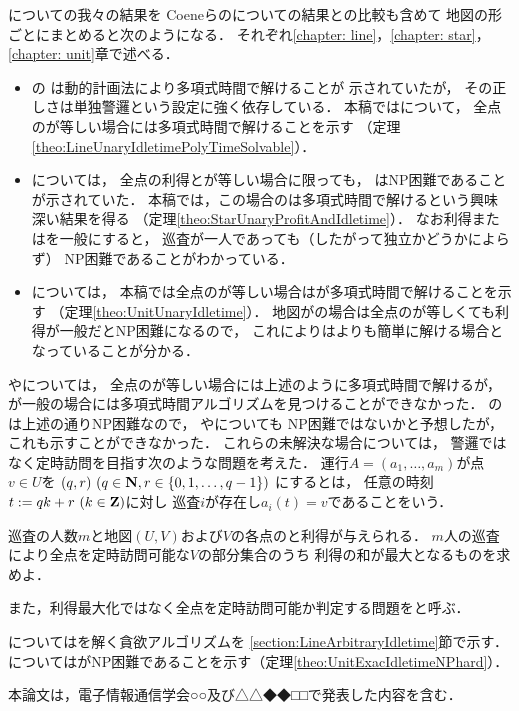 {\patProb}についての我々の結果を
Coeneらの{\independentPatProb}についての結果との比較も含めて
地図の形ごとにまとめると次のようになる．
それぞれ\ref{chapter: line}，\ref{chapter: star}，\ref{chapter: unit}章で述べる．
\begin{itemize}
\item 
  {\graphLine}の
  {\independentPatProb}は動的計画法により多項式時間で解けることが
  示されていた\cite[Theorem~11]{coene2011charlemagne}が，
  その正しさは単独警邏という設定に強く依存している．
  本稿では{\patProb}について，
  全点の{\maxIdletime}が等しい場合には多項式時間で解けることを示す
  （定理\ref{theo:LineUnaryIdletimePolyTimeSolvable}）．
\item
  {\graphStar}については，
  全点の利得と{\maxIdletime}が等しい場合に限っても，
  {\independentPatProb}はNP困難であることが示されていた\cite[Theorem~10]{coene2011charlemagne}．
  本稿では，この場合の{\patProb}は多項式時間で解けるという興味深い結果を得る
  （定理\ref{theo:StarUnaryProfitAndIdletime}）．
  なお利得または{\maxIdletime}を一般にすると，
  巡査が一人であっても（したがって独立かどうかによらず）
  NP困難であることがわかっている\cite[Theorems 5 and 6]{coene2011charlemagne}．
\item 
  {\graphUnit}については，
  本稿では全点の{\maxIdletime}が等しい場合は{\patProb}が多項式時間で解けることを示す
  （定理\ref{theo:UnitUnaryIdletime}）．
  地図が{\graphStar}の場合は全点の{\maxIdletime}が等しくても利得が一般だとNP困難になるので，
  これにより{\graphUnit}は{\graphStar}よりも簡単に解ける場合となっていることが分かる．
\end{itemize}

{\graphLine}や{\graphUnit}については，
全点の{\maxIdletime}が等しい場合には上述のように多項式時間で解けるが，
{\maxIdletime}が一般の場合には多項式時間アルゴリズムを見つけることができなかった．
{\graphStar}の{\patProb}は上述の通りNP困難なので\cite[Theorems 5 and 6]{coene2011charlemagne}，
{\graphLine}や{\graphUnit}についても
NP困難ではないかと予想したが，これも示すことができなかった．
これらの未解決な場合については，
警邏ではなく定時訪問を目指す次のような問題を考えた．
%
運行$A = (a _1, \ldots, a _m)$が点$v \in U$を
{\exactTime}$(q, r)\ (q \in \mathbf N, r \in \{ 0, 1, \ldots, q - 1 \})$%
にするとは，
任意の時刻$t := q k + r\ (k \in \mathbf Z)$に対し
巡査$i$が存在し$a _i (t) = v$であることをいう．

\begin{timeSpecifiedPatrollingProblem}
  巡査の人数$m$と地図$(U, V)$および$V$の各点の{\exactTime}と利得が与えられる．
  $m$人の巡査により全点を定時訪問可能な$V$の部分集合のうち
  利得の和が最大となるものを求めよ．
\end{timeSpecifiedPatrollingProblem}

また，利得最大化ではなく全点を定時訪問可能か判定する問題を{\timeSpecifiedPatProbDecision}と呼ぶ．


{\graphLine}については{\timeSpecifiedPatProbDecision}を解く貪欲アルゴリズムを
\ref{section:LineArbitraryIdletime}節で示す．
{\graphUnit}については{\timeSpecifiedPatProb}がNP困難であることを示す（定理\ref{theo:UnitExacIdletimeNPhard}）．


本論文は，電子情報通信学会○○\cite{}及び△△◆◆□□\cite{}で発表した内容を含む．
